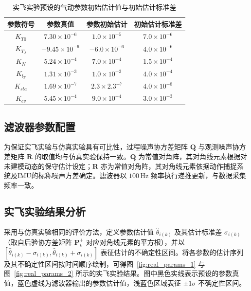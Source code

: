 \begin{table}[htbp]
    \centering
    \caption{实飞实验预设的气动参数初始估计值与初始估计标准差}
    \label{tab:real_flight_true_theta}
    \begin{tabular}{cccc}
    \toprule
    参数符号 & 参数真值 & 参数初始估计 & 初始估计标准差 \\
    \midrule
    $K_{T0}$ & $7.30 \times 10^{-6}$ & $1.0 \times 10^{-5}$ & $7.0 \times 10^{-6}$ \\
    $K_{T_J}$ & $-9.45 \times 10^{-6}$ & $-6.0 \times 10^{-6}$ & $4.0 \times 10^{-6}$ \\
    $K_{N}$ & $5.24 \times 10^{-4}$ & $7.0 \times 10^{-4}$ & $1.5 \times 10^{-4}$ \\
    $K_{l_T}$ & $1.31 \times 10^{-3}$ & $1.0 \times 10^{-3}$ & $4.0 \times 10^{-4}$ \\
    $K_{sta}$ & $1.69 \times 10^{-7}$ & $2.3 \times 2.3^{-7}$ & $4.0 \times 10^{-8}$ \\
    $K_{cv}$ & $5.45 \times 10^{-4}$ & $9.0 \times 10^{-4}$ & $3.0 \times 10^{-3}$ \\
    \bottomrule
    \end{tabular}
\end{table}

\subsection{滤波器参数配置}
为保证实飞实验与仿真实验具有可比性，过程噪声协方差矩阵 \(\bm{Q}\) 与观测噪声协方差矩阵 \(\bm{R}\) 的取值均与仿真实验保持一致。\(\bm{Q}\) 为常值对角阵，其对角线元素根据对未建模动态的保守估计设定；\(\bm{R}\) 亦为常值对角阵，其对角线元素依据动作捕捉系统及IMU的标称噪声方差确定。滤波器以 \(100\,\mathrm{Hz}\) 频率执行递推更新，与数据采集频率一致。

\subsection{实飞实验结果分析}
采用与仿真实验相同的评价方法，定义参数估计值 \(\hat{\theta}_{i(k)}\) 及其估计标准差 \(\sigma_{i(k)}\)（取自后验协方差矩阵 \(\bm{P}_k^+\) 对应对角线元素的平方根），并以 \(\left[\hat{\theta}_{i(k)} - \sigma_{i(k)}, \hat{\theta}_{i(k)} + \sigma_{i(k)}\right]\) 表征估计的不确定性区间。将各参数的估计序列及其不确定性区间按时间顺序绘制，可得图~\ref{fig:real_params_1} 与图~\ref{fig:real_params_2} 所示的实飞实验结果。图中黑色实线表示预设的参数真值，蓝色虚线为滤波器输出的参数估计值，浅蓝色区域表征 \(\pm 1\sigma\) 不确定性区间。

